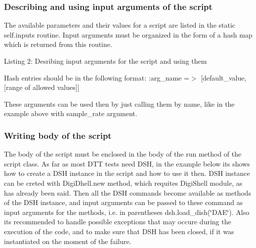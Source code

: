 \hypertarget{a00836_describing_and_using_input_arguments_of_the_script}{}\subsubsection{Describing and using input arguments of the script}\label{a00836_describing_and_using_input_arguments_of_the_script}
 The available parameters and their values for a script are listed in the static {\ttfamily self.\+inputs} routine. Input arguments must be organized in the form of a hash map which is returned from this routine.


\begin{DoxyCode}{0}
\DoxyCodeLine{    \textcolor{keywordflow}{return} \{}
\DoxyCodeLine{    \}}
\DoxyCodeLine{}
\end{DoxyCode}
 Listing 2\+: Desribing input arguments for the script and using them

Hash entries should be in the following format\+:  \+:arg\+\_\+name =$>$ \mbox{[}default\+\_\+value, \mbox{[}range of allowed values\mbox{]}\mbox{]} 

These arguments can be used then by just calling them by name, like in the example above with {\ttfamily sample\+\_\+rate} argument.

\hypertarget{a00836_writing_body_of_the_script}{}\subsubsection{Writing body of the script}\label{a00836_writing_body_of_the_script}
 The body of the script must be enclosed in the body of the {\ttfamily run} method of the script class. As far as most D\+TT tests need D\+SH, in the example below it\textquotesingle{}s shows how to create a D\+SH instance in the script and how to use it then. D\+SH instance can be creted with {\ttfamily Digi\+Dhell.\+new} method, which requites Digi\+Shell module, as has already been said. Then all the D\+SH commands become available as methods of the D\+SH instance, and input arguments can be passed to these command as input arguments for the methods, i.\+e. in parentheses {\ttfamily dsh.\+load\+\_\+dish(\char`\"{}\+D\+A\+E\char`\"{})}. Also it\textquotesingle{}s recommended to handle possible exceptions that may occure during the execution of the code, and to make sure that D\+SH has been closed, if it was instantiated on the moment of the failure.


